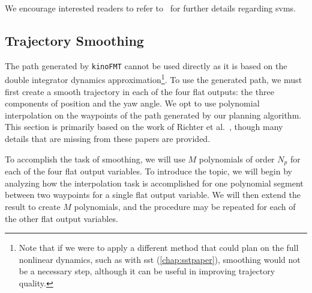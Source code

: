 We encourage interested readers to refer to~\cite{Smola2004} for further details regarding \gls{svm}s. 




\subsection{Trajectory Smoothing}

The path generated by \texttt{kinoFMT} cannot be used directly as it is based on the double integrator dynamics approximation\footnote{Note that if we were to apply a different method that could plan on the full nonlinear dynamics, such as with \gls{sst} (\autoref{chap:sstpaper}), smoothing would not be a necessary step, although it can be useful in improving trajectory quality.}. To use the generated path, we must first create a smooth trajectory in each of the four flat outputs: the three components of position and the yaw angle. We opt to use polynomial interpolation on the waypoints of the path generated by our planning algorithm. This section is primarily based on the work of Richter et al.~\cite{Richter2016}, though many details that are missing from these papers are provided.

To accomplish the task of smoothing, we will use $M$ polynomials of order $N_p$ for each of the four flat output variables. To introduce the topic, we will begin by analyzing how the interpolation task is accomplished for one polynomial segment between two waypoints for a single flat output variable. We will then extend the result to create $M$ polynomials, and the procedure may be repeated for each of the other flat output variables.

